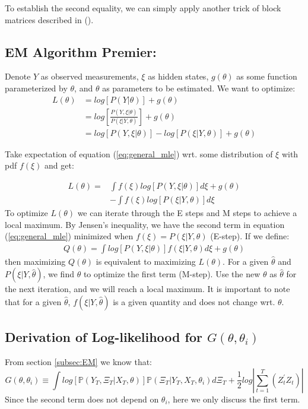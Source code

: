 \documentclass[10pt]{article}
\numberwithin{equation}{section}
\begin{document}
To establish the second equality, we can simply apply another trick of block matrices described in (\cite{petersen2008matrix}).

\subsection{EM Algorithm Premier:} \label{ap:EM_proof}
Denote $Y$ as observed measurements, $\xi$ as hidden states, $g(\theta)$ as some function parameterized by $\theta$, and $\theta$ as parameters to be estimated. We want to optimize:
\begin{align}
    L(\theta) & = log[P(Y|\theta)] + g(\theta) \nonumber \\
    & = log\left[\frac{P(Y,\xi|\theta)}{P(\xi|Y,\theta)}\right] +g(\theta) \nonumber \\
    & = log[P(Y,\xi|\theta)] - log[P(\xi|Y,\theta)] +g(\theta) \label{eq:general_mle}
\end{align}

Take expectation of equation (\ref{eq:general_mle}) wrt. some distribution of $\xi$ with pdf $f(\xi)$ and get:

\begin{align}
    L(\theta) = & \int f(\xi)log[P(Y,\xi|\theta)]d\xi + g(\theta) \nonumber \\
    & - \int f(\xi)log[P(\xi|Y,\theta)]d\xi \nonumber
\end{align}
To optimize $L(\theta)$ we can iterate through the E steps and M steps to achieve a local maximum. By Jensen's inequality, we have the second term in equation (\ref{eq:general_mle}) minimized when $f(\xi)=P(\xi|Y,\theta)$ (E-step). If we define:
\begin{align}
    Q(\theta) = \int log[P(Y,\xi|\theta)]f(\xi|Y,\theta)d\xi + g(\theta) \label{eq:Q}
\end{align}
then maximizing $Q(\theta)$ is equivalent to maximizing $ L(\theta)$. For a given $\hat{\theta}$ and $P(\xi|Y, \hat{\theta})$, we find $\theta$ to optimize the first term (M-step). Use the new $\theta$ as $\hat{\theta}$ for the next iteration, and we will reach a local maximum. It is important to note that for a given $\hat{\theta}$, $f(\xi|Y, \hat{\theta})$ is a given quantity and does not change wrt. $\theta$. 

\subsection{Derivation of Log-likelihood for $G(\theta,\theta_i)$} \label{ap:log}
From section \ref{subsec:EM} we know that:
\[
    G(\theta,\theta_i) \equiv \int log[\mathbb{P}(Y_T,\Xi_T|X_T,\theta)]\mathbb{P}(\Xi_T|Y_T,X_T,\theta_i)d\Xi_T + \frac{1}{2}log\left|\sum_{t=1}^{T}(Z_t^{'}Z_t)\right| 
\]
Since the second term does not depend on $\theta_i$, here we only discuss the first term. 
\end{document}
